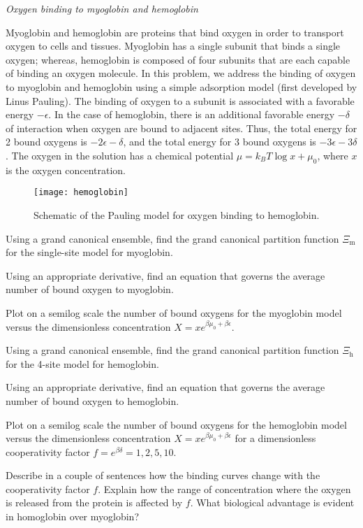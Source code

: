 {\sl Oxygen binding to myoglobin and hemoglobin}

Myoglobin and hemoglobin are proteins that bind oxygen in order to transport oxygen to
cells and tissues.
Myoglobin has a single subunit that binds a single oxygen; whereas, hemoglobin
is composed of four subunits that are each capable of binding an oxygen molecule.
In this problem, we address the binding of oxygen to myoglobin and hemoglobin
using a simple adsorption model (first developed by Linus Pauling).
The binding of oxygen to a subunit is associated with a favorable energy $-\epsilon$.
In the case of hemoglobin,
there is an additional favorable energy $-\delta$ of interaction when
oxygen are bound to adjacent sites.  Thus, the total energy for
2 bound oxygens is $-2 \epsilon - \delta$, and the total
energy for 3 bound oxygens is $-3 \epsilon - 3 \delta$.
The oxygen in the solution has a chemical potential 
$\mu = k_{B}T \log x +\mu_{0}$, where $x$ is the oxygen concentration.

\begin{figure}[h]\centering
\texttt{[image: hemoglobin]}
\caption{\label{fig:hemoglobin}
Schematic of the Pauling model for oxygen binding to hemoglobin.}
\end{figure}

\smallskip\subp
Using a grand canonical ensemble, find the grand canonical partition function
$\Xi_\text{m}$ for the single-site model for myoglobin.

\smallskip\subp
Using an appropriate derivative, find an equation that governs
the average number of bound oxygen to myoglobin.

\smallskip\subp
Plot on a semilog scale the number of bound oxygens for the myoglobin model
versus the dimensionless concentration
$X=xe^{\beta \mu_{0}+\beta \epsilon}$.

\smallskip\subp
Using a grand canonical ensemble, find the grand canonical partition function
$\Xi_\text{h}$ for the 4-site model for hemoglobin.

\smallskip\subp
Using an appropriate derivative, find an equation that governs
the average number of bound oxygen to hemoglobin.

\smallskip\subp
Plot on a semilog scale the number of bound oxygens for the hemoglobin model
versus the dimensionless concentration
$X=xe^{\beta \mu_{0}+\beta \epsilon}$
for a dimensionless cooperativity factor $f=e^{\beta \delta}=1,2,5,10$.

\smallskip\subp
Describe in a couple of sentences how the
binding curves change with the cooperativity factor $f$.
Explain how the range of concentration where the oxygen
is released from the protein is affected by $f$.
What biological advantage is evident in homoglobin over
myoglobin?

